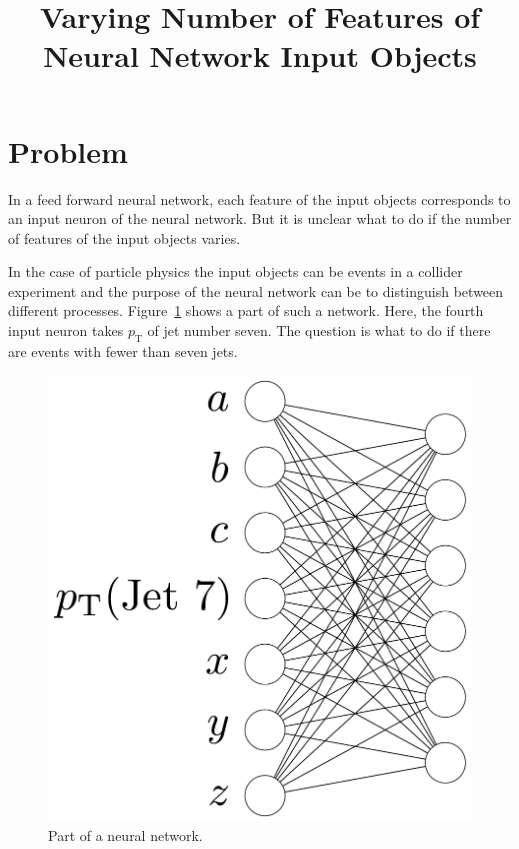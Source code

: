 \documentclass[12pt,a4paper]{article}
\title{Varying Number of Features of Neural Network Input Objects}
\author{}
\date{}
\begin{document}
\maketitle

\section{Problem}

In a feed forward neural network, each feature of the input objects corresponds to an input neuron of the neural network. But it is unclear what to do if the number of features of the input objects varies.

In the case of particle physics the input objects can be events in a collider experiment and the purpose of the neural network can be to distinguish between different processes. Figure~\ref{fig::NN_picture_1} shows a part of such a network. Here, the fourth input neuron takes $p_\text{T}$ of jet number seven. The question is what to do if there are events with fewer than seven jets.


\begin{figure}
\begin{center}
\includegraphics[scale=0.4]{NN_picture_1.pdf}
\caption{Part of a neural network.}
\label{fig::NN_picture_1}
\end{center}
\end{figure}
\end{document}
